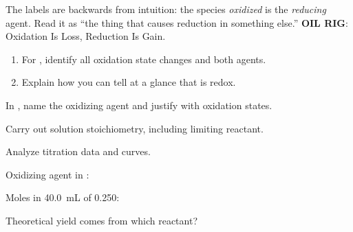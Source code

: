 \documentclass{apchem-notes}
\begin{document}
\begin{apctrap}
The labels are backwards from intuition: the species \emph{oxidized} is the
\emph{reducing} agent. Read it as ``the thing that causes reduction in
something else.'' \textbf{OIL RIG}: Oxidation Is Loss, Reduction Is Gain.
\end{apctrap}


\begin{enumerate}[leftmargin=*,itemsep=0.4em]
  \item For , identify all
        oxidation state changes and both agents.
  \item Explain how you can tell at a glance that
         is redox.
\end{enumerate}

\begin{exitticket}
In , name the oxidizing agent and
justify with oxidation states. 
\end{exitticket}


\begin{objectives}
  \item Carry out solution stoichiometry, including limiting reactant.
  \item Analyze titration data and curves.
\end{objectives}

\quad{}

\begin{warmup}[3]
  \item Oxidizing agent in :
  \item Moles in \SI{40.0}{\milli\liter} of \SI{0.250}{\Molar}:
  \item Theoretical yield comes from which reactant?
\end{warmup}
\end{document}
